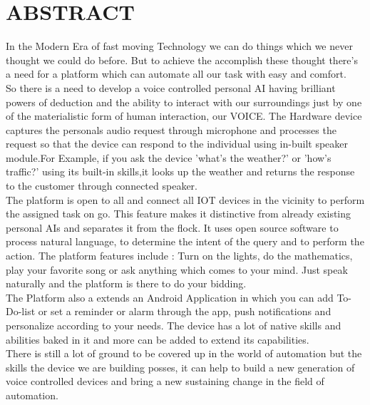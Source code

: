\chapter*{\Huge\textbf{ABSTRACT}}

\hspace*{5em}In the Modern Era of fast moving Technology we can do things which we never thought we could do before. But to achieve the accomplish these thought there's a need for a platform which can automate all our task with easy and comfort.\\

\noindent
So there is a need to develop a voice controlled personal AI having brilliant powers of deduction and the ability to interact with our surroundings just by one of the materialistic form of human interaction, our VOICE. The Hardware device captures the personals audio request through microphone and processes the request so that the device can respond to the individual using in-built speaker module.For Example, if you ask the device ’what’s the weather?’ or ’how’s traffic?’ using its built-in skills,it looks up the weather and returns the response to the customer through connected speaker.\\

\noindent
The platform is open to all and connect all IOT devices in the vicinity to perform the assigned task on go. This feature makes it distinctive from already existing personal AIs and separates it from the flock. It uses open source software to process natural language, to determine the intent of the query and to perform the action. The platform features include : Turn on the lights, do the mathematics, play your favorite song or ask anything which comes to your mind. Just speak naturally and the platform is there to do your bidding.\\

\noindent
The Platform also a extends an Android Application in which you can add To-Do-list or set a reminder or alarm through the app, push notifications and personalize according to your needs. The device has a lot of native skills and abilities baked in it and more can be added to extend its capabilities.\\

\noindent
There is still a lot of ground to be covered up in the world of automation but the skills the device we are building posses, it can help to build a new generation of voice controlled devices and bring a new sustaining change in the field of automation.


